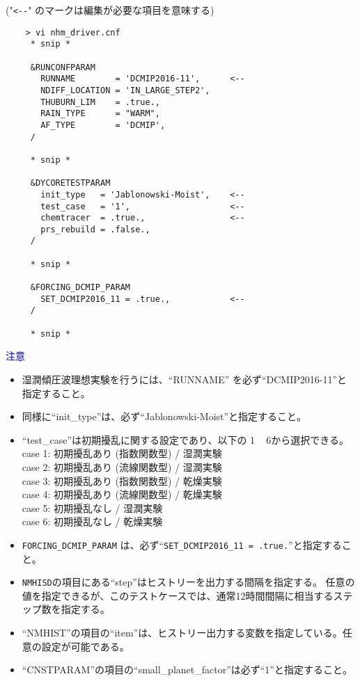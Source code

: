  \vspace{0.5cm}

 ("\verb|<--|" のマークは編集が必要な項目を意味する)
 \begin{verbatim}
    > vi nhm_driver.cnf
     * snip *

     &RUNCONFPARAM
       RUNNAME        = 'DCMIP2016-11',      <--
       NDIFF_LOCATION = 'IN_LARGE_STEP2',
       THUBURN_LIM    = .true.,
       RAIN_TYPE      = "WARM",
       AF_TYPE        = 'DCMIP',
     /

     * snip *

     &DYCORETESTPARAM
       init_type   = 'Jablonowski-Moist',    <--
       test_case   = '1',                    <--
       chemtracer  = .true.,                 <--
       prs_rebuild = .false.,
     /

     * snip *

     &FORCING_DCMIP_PARAM
       SET_DCMIP2016_11 = .true.,            <--
     /

     * snip *
 \end{verbatim}

 \noindent \textcolor{blue}{{\sf 注意}}
 \begin{itemize}
   \item 湿潤傾圧波理想実験を行うには、``RUNNAME'' を必ず``DCMIP2016-11''と指定すること。
   \item 同様に``init\_type''は、必ず``Jablonowski-Moist''と指定すること。
   \item ``test\_case''は初期擾乱に関する設定であり、以下の 1 ~ 6から選択できる。\\
          case 1: 初期擾乱あり (指数関数型) / 湿潤実験 \\
          case 2: 初期擾乱あり (流線関数型) / 湿潤実験 \\
          case 3: 初期擾乱あり (指数関数型) / 乾燥実験 \\
          case 4: 初期擾乱あり (流線関数型) / 乾燥実験 \\
          case 5: 初期擾乱なし / 湿潤実験 \\
          case 6: 初期擾乱なし / 乾燥実験
   \item \verb|FORCING_DCMIP_PARAM| は、必ず``\verb|SET_DCMIP2016_11 = .true.|''と指定すること。
   \item \verb|NMHISD|の項目にある``step''はヒストリーを出力する間隔を指定する。
           任意の値を指定できるが、このテストケースでは、通常12時間間隔に相当するステップ数を指定する。
   \item ``NMHIST''の項目の``item''は、ヒストリー出力する変数を指定している。任意の設定が可能である。
   \item ``CNSTPARAM''の項目の``small\_planet\_factor''は必ず``1''と指定すること。
 \end{itemize}

